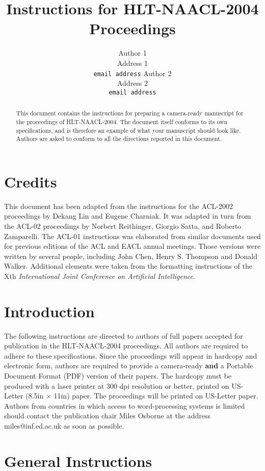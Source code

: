 \documentclass[10pt]{article}
\title{Instructions for HLT-NAACL-2004 Proceedings}
\author{Author 1\\
  Address 1\\
  {\tt email address} \And
  Author 2\\
  Address 2\\
  {\tt email address}}
\date{}
\begin{document}
\maketitle
\begin{abstract}
  This document contains the instructions for preparing a camera-ready
  manuscript for the proceedings of HLT-NAACL-2004. The document itself conforms
  to its own specifications, and is therefore an example of what
  your manuscript should look like.  Authors are asked to conform to
  all the directions reported in this document.
\end{abstract}

\section{Credits}

This document has been adapted from the instructions for the
ACL-2002 proceedings by Dekang Lin and Eugene Charniak.  It was
adapted in turn from the ACL-02 proceedings by Norbert Reithinger,
Giorgio Satta, and Roberto Zamparelli. The ACL-01 instructions was
elaborated from similar documents used for previous editions of the
ACL and EACL annual meetings. Those versions were written by several
people, including John Chen, Henry S. Thompson and Donald
Walker. Additional elements were taken from the formatting
instructions of the Xth {\em International Joint Conference on
Artificial Intelligence}.

\section{Introduction}

The following instructions are directed to authors of full papers accepted
for publication in the HLT-NAACL-2004 proceedings.  All authors are required
to adhere to these specifications. Since the proceedings will appear
in hardcopy and electronic form, authors are required to provide a
camera-ready {\bf and} a Portable Document Format (PDF) version of
their papers. The hardcopy must be produced with a laser printer at
300 dpi resolution or better, printed on US-Letter (8.5in $\times$
11in) paper. The proceedings will be printed on US-Letter paper.
Authors from countries in which access to word-processing systems is
limited should contact the publication chair Miles Osborne at the
address miles@inf.ed.ac.uk as soon as possible.


\section{General Instructions}
\end{document}
